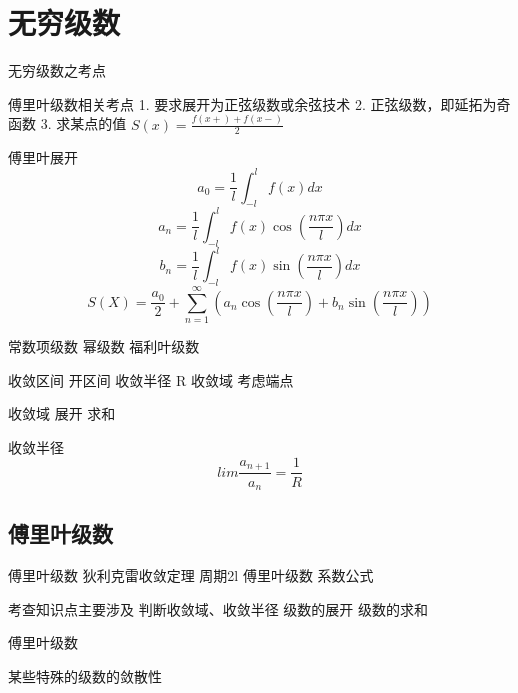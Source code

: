 \chapter{无穷级数}


无穷级数之考点

傅里叶级数相关考点
1. 要求展开为正弦级数或余弦技术
2. 正弦级数，即延拓为奇函数
3. 求某点的值 $S(x) = \frac{f(x+)+f(x-)}{2}$

傅里叶展开
$$ a_0 = \frac{1}{l} \int_{-l}^{l} f(x) dx $$
$$ a_n = \frac{1}{l} \int_{-l}^{l} f(x)\cos(\frac{n\pi x}{l}) dx $$
$$ b_n = \frac{1}{l} \int_{-l}^{l} f(x)\sin(\frac{n\pi x}{l}) dx $$ 
$$ S(X) = \frac{a_0}{2} + \sum_{n=1}^{\infty}(a_n\cos(\frac{n\pi x}{l}) + b_n\sin(\frac{n\pi x}{l})) $$

常数项级数
幂级数
福利叶级数

收敛区间 开区间
收敛半径 R
收敛域   考虑端点

收敛域
展开
求和


收敛半径
$$lim \frac{a_{n+1}}{a_n} = \frac{1}{R} $$




\section{傅里叶级数}

傅里叶级数
狄利克雷收敛定理
周期2l
傅里叶级数
系数公式


考查知识点主要涉及
判断收敛域、收敛半径
级数的展开
级数的求和

傅里叶级数

某些特殊的级数的敛散性
